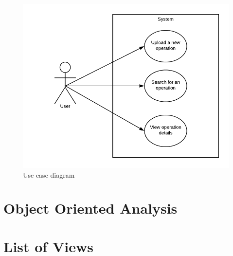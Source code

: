 \begin{figure}[h]
\begin{center}
\includegraphics[width=17cm]{imgs/Use_Case_Diagram.png}
\end{center}\vspace{-0.3cm}
\caption[Use Case Diagram]{Use case diagram} \label{UC-diagram}
\end{figure}


\section{Object Oriented Analysis}
\label{sub:object_oriented_analysis}


\section{List of Views}
\label{sub:views}



\blindtext
\blindtext

